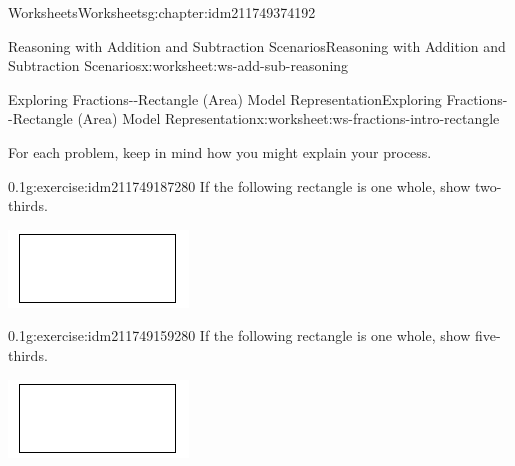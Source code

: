 \documentclass[twoside,11pt,]{book}
\begin{document}
\begin{chapterptx}{Worksheets}{}{Worksheets}{}{}{g:chapter:idm211749374192}
\begin{worksheet-section-numberless}{Reasoning with Addition and Subtraction Scenarios}{}{Reasoning with Addition and Subtraction Scenarios}{}{}{x:worksheet:ws-add-sub-reasoning}
\end{worksheet-section-numberless}
\restoregeometry
%
%
\typeout{************************************************}
\typeout{************************************************}
%
\begin{worksheet-section-numberless}{Exploring Fractions-{}-{}Rectangle (Area) Model Representation}{}{Exploring Fractions-{}-{}Rectangle (Area) Model Representation}{}{}{x:worksheet:ws-fractions-intro-rectangle}
\begin{introduction}{}%
For each problem, keep in mind how you might explain your process.%
\end{introduction}%
\begin{divisionexercise}{1}{}{0.1}{g:exercise:idm211749187280}%
If the following rectangle is one whole, show two-thirds. \begin{sidebyside}{1}{0.3}{0.3}{0}%
\begin{sbspanel}{0.4}%
\includegraphics[width=1\linewidth]{images/generic-rectangle.png}
\end{sbspanel}%
\end{sidebyside}%
%
\end{divisionexercise}%
\begin{divisionexercise}{2}{}{0.1}{g:exercise:idm211749159280}%
If the following rectangle is one whole, show five-thirds. \begin{sidebyside}{1}{0.3}{0.3}{0}%
\begin{sbspanel}{0.4}%
\includegraphics[width=1\linewidth]{images/generic-rectangle.png}

\end{sbspanel}
\end{sidebyside}
\end{divisionexercise}
\end{worksheet-section-numberless}
\end{chapterptx}
\end{document}
